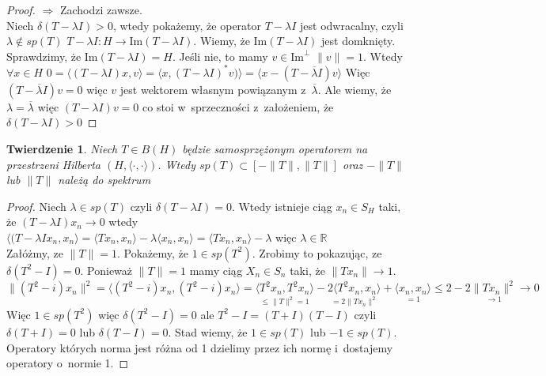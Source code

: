 \documentclass[11pt]{mwrep}
\renewcommand{\[}{\begin{equation}}
\renewcommand{\]}{\end{equation}}
\newcommand{\R}{{\ensuremath{\mathbb R}}}
\newcommand{\scal}{\langle \cdot,\cdot \rangle}
\newtheorem{twr}[subsection]{Twierdzenie}%
\begin{document}
\begin{proof}
	$\Rightarrow$ Zachodzi zawsze.\\
	Niech $\delta(T - \lambda I)>0$, wtedy pokażemy, że operator $T - \lambda I$ jest odwracalny, czyli $\lambda \not \in sp(T)$
	$T-\lambda I \colon H \to \textrm{Im} (T - \lambda I)$. Wiemy, że $\textrm{Im} (T- \lambda I)$ jest domknięty. 
	Sprawdzimy, że $\textrm{Im}(T-\lambda I) = H$. Jeśli nie, to mamy $v \in \textrm{Im}^\perp$  $\|v\|=1$.
	Wtedy $\forall x \in H$ $0= \langle (T - \lambda I) x ,v  \rangle = \langle  x, (T - \lambda I)^* v)  \rangle = \langle x - (T- \overline{\lambda} I) v \rangle$
	Więc $(T - \overline{\lambda} I) v=0$ więc $v$ jest wektorem własnym powiązanym z~$\overline{\lambda}$. Ale wiemy, że $\lambda=\overline\lambda$
	więc $(T - \lambda I) v =0$ co stoi w~sprzeczności z~założeniem, że $\delta(T- \lambda I) >0$ 

\end{proof}
\begin{twr}
	Niech  $T\in B(H)$ będzie samosprzężonym operatorem na przestrzeni Hilberta $(H,\scal)$. Wtedy 
	$sp(T) \subset [-\|T\|, \|T\|]$ oraz $-\|T\|$ lub $\|T\|$ należą do spektrum 
\end{twr}
\begin{proof}
	Niech $\lambda \in sp (T)$ czyli $\delta(T - \lambda I) =0 $. Wtedy istnieje ciąg $x_n \in S_H$ taki, że
	$(T- \lambda I)x_n \to 0$ wtedy $ \langle (T - \lambda I x_n, x_n  \rangle = \langle Tx_n ,x_n \rangle - \lambda\langle x_n, x_n \rangle
	= \langle T x_n, x_n  \rangle - \lambda$  więc $\lambda \in \R$\\
	Załóżmy, ze $\|T\|=1$. Pokażemy, że $1 \in sp(T^2)$. Zrobimy to pokazując, ze $\delta(T^2 - I ) =0$.
	Ponieważ $\|T\| =1$ mamy ciąg $X_n \in S_n$ taki, że $\|T {x_n}\| \to 1$.
	$$\|(T^2-i) x_n\|^2 = \langle (T^2-i) x_n, (T^2-i) x_n \rangle = \underset{\le \|T\|^2 =1}{\langle T^2 x_n, T^2 x_n   \rangle} - 
	\underset{=2\|T x_n\|^2}{ 2 \langle T^2 x_n, x _n \rangle} 
	+\underset{=1}{\langle x_n, x _n \rangle} \le 2 - 2\underset{\to 1}{\|T x_n \|^2} \to 0$$ 
	Więc $1 \in sp(T^2)$ więc $\delta(T^2 - I) = 0$ ale $T^2 - I = (T+I)(T - I)$
	czyli $\delta(T+I) =0 $ lub $\delta(T - I) =0$. Stad wiemy, że $1 \in sp(T)$ lub $-1 \in sp(T)$.
	Operatory których norma jest różna od 1 dzielimy przez ich normę i~dostajemy operatory o~normie 1. 
\end{proof}
\end{document}
